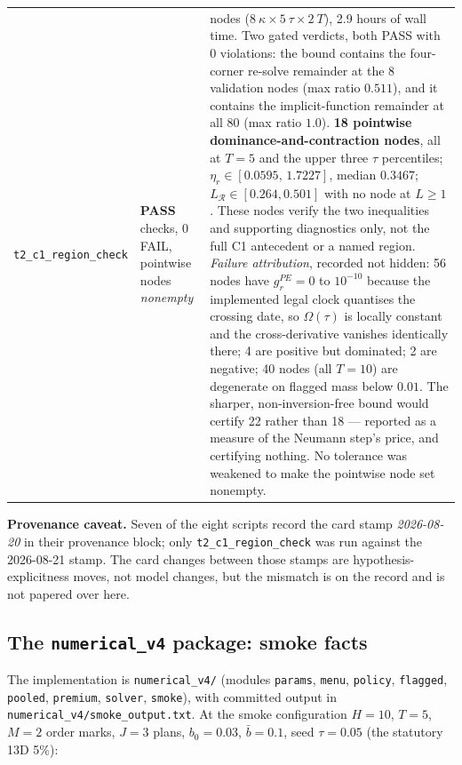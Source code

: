 \documentclass[11pt,a4paper]{article}
\begin{document}
\begin{longtable}{@{}>{\raggedright\arraybackslash}p{}>{\raggedright\arraybackslash}p{}>{\raggedright\arraybackslash}p{}@{}}
\texttt{t2\_c1\_region\_check} & \textbf{PASS} \newline 12 checks, 0 FAIL, pointwise
nodes \emph{nonempty} &
80 nodes ($8\ \kappa\times5\ \tau\times2\ T$), 2.9 hours of wall time. Two gated
verdicts, both PASS with 0 violations: the bound contains the four-corner re-solve
remainder at the 8 validation nodes (max ratio $0.511$), and it contains the
implicit-function remainder at all 80 (max ratio $1.0$). \textbf{18 pointwise
dominance-and-contraction nodes}, all at $T=5$ and the upper three $\tau$
percentiles; $\eta_r\in[0.0595,\,1.7227]$, median $0.3467$;
$L_{\mathcal R}\in[0.264,0.501]$ with no node at $L\ge1$. These nodes verify the two
inequalities and supporting diagnostics only, not the full C1 antecedent or a named
region. \emph{Failure attribution}, recorded not hidden: 56 nodes have
$g_r^{PE}=0$ to $10^{-10}$ because the implemented legal clock quantises the crossing
date, so $\Omega(\tau)$ is locally constant and the cross-derivative vanishes
identically there; 4 are positive but dominated; 2 are negative; 40 nodes (all
$T=10$) are degenerate on flagged mass below $0.01$. The sharper,
non-inversion-free bound would certify 22 rather than 18 --- reported as a measure of
the Neumann step's price, and certifying nothing. No tolerance was weakened to make
the pointwise node set nonempty. \\
\end{longtable}
\endgroup

\noindent\textbf{Provenance caveat.} Seven of the eight scripts record the card
stamp \emph{2026-08-20} in their provenance block; only
\texttt{t2\_c1\_region\_check} was run against the 2026-08-21 stamp. The card
changes between those stamps are hypothesis-explicitness moves, not model changes,
but the mismatch is on the record and is not papered over here.

\subsection*{The \texttt{numerical\_v4} package: smoke facts}

The implementation is \texttt{numerical\_v4/} (modules \texttt{params},
\texttt{menu}, \texttt{policy}, \texttt{flagged}, \texttt{pooled},
\texttt{premium}, \texttt{solver}, \texttt{smoke}), with committed output in
\texttt{numerical\_v4/smoke\_output.txt}. At the smoke configuration
$H=10$, $T=5$, $M=2$ order marks, $J=3$ plans, $b_0=0.03$, $\bar b=0.1$, seed
$\tau=0.05$ (the statutory 13D 5\%):
\end{document}
